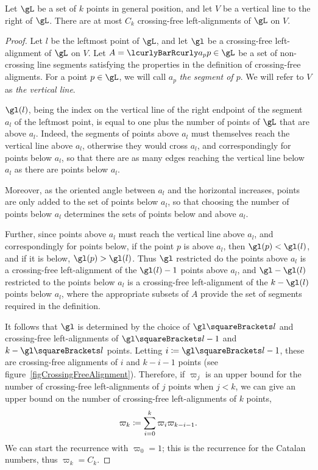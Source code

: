 \documentclass[10pt, a4paper, twoside]{basestyle}
\begin{document}
\begin{lemma}
Let $\gL$ be a set of $k$ points in general position, and let $V$ be a vertical line to the right of $\gL$.
There are at most $C_k$ crossing-free left-alignments of $\gL$ on $V$.
\begin{proof}
Let $l$ be the leftmost point of $\gL$, and let $\gl$ be a crossing-free left-alignment of $\gL$ on $V$.
Let $A=\setst{a_p}{p\in\gL}$ be a set of non-crossing line segments satisfying the properties in the definition
of crossing-free aligments.
For a point $p\in\gL$, we will call $a_p$ \emph{the segment of $p$}. We will refer to $V$ as
\emph{the vertical line}.

$\gl(l)$, being the index on the vertical line of the right endpoint of the segment $a_l$ of the leftmost point,
is equal to one plus the number of points of $\gL$ that are above $a_l$. Indeed, the segments of points above $a_l$ must
themselves reach the vertical line above $a_l$, otherwise they would cross $a_l$, and correspondingly for
points below $a_l$, so that there are as many edges reaching the vertical line below $a_l$ as there are points
below $a_l$.

Moreover, as the oriented angle between $a_l$ and the horizontal increases, points are only added to the
set of points below $a_l$, so that choosing the number of points below $a_l$ determines the sets of points
below and above $a_l$.

Further, since points above $a_l$ must reach the vertical line above $a_l$, and correspondingly for points below,
if the point $p$ is above $a_l$, then $\gl(p) < \gl(l)$, and if it is below, $\gl(p) > \gl(l)$. Thus
$\gl$ restricted do the points above $a_l$ is a crossing-free left-alignment of the $\gl(l) - 1$ points above
$a_l$, and $\gl-\gl(l)$ restricted to the points below $a_l$ is a crossing-free left-alignment of the
$k - \gl(l)$ points below $a_l$, where the appropriate subsets of $A$ provide the set of segments required
in the definition.

It follows that $\gl$ is determined by the choice of $\gl\of l$ and crossing-free left-alignments
of $\gl\of{l}-1$ and $k-\gl\of{l}$ points.
Letting $i\DefineAs \gl\of l - 1$, these are crossing-free alignments of $i$ and $k-i-1$ points (see
figure~\ref{figCrossingFreeAlignment}).
Therefore, if $\varpi_j$ is an upper bound for the number of crossing-free
left-alignments of $j$ points when $j < k$,
we can give an upper bound on the number of crossing-free left-alignments of $k$ points,
\[\varpi_k\DefineAs\sum{i=0}[k]\varpi_{i}\varpi_{k-i-1}\text.\]
We can start the recurrence with $\varpi_0 = 1$; this is the recurrence for the Catalan numbers, thus
$\varpi_k=C_k$.
\end{proof}
\end{lemma}
\end{document}
